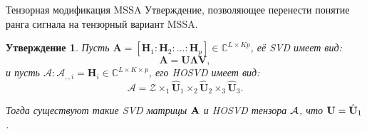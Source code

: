 \documentclass[ucs, notheorems, handout]{beamer}
\newtheorem{statement}{Утверждение}
\begin{document}
    \begin{frame}{Тензорная модификация MSSA}
        Утверждение, позволяющее перенести понятие ранга сигнала на тензорный вариант MSSA.

        \vspace{0.2cm}

        \begin{statement}
            Пусть $\mathbf{A} = [\mathbf{H}_1: \mathbf{H}_2: \ldots: \mathbf{H}_p] \in \mathbb{C}^{L\times Kp}$,
            её SVD имеет вид:
            \[
                \mathbf{A} =\mathbf{U} \mathbf{\Lambda} \mathbf{V},
            \]
            и пусть $\mathcal{A}: \mathcal{A}_{,,i} = \mathbf{H}_i \in \mathbb{C}^{L\times K \times p}$, его HOSVD имеет вид:
            \[
                \mathcal{A}=\mathcal{Z} \times_1 \hat{\mathbf{U}}_1 \times_2 \hat{\mathbf{U}}_2 \times_3 \hat{\mathbf{U}}_3.
            \]

            Тогда существуют такие SVD матрицы $\mathbf{A}$ и HOSVD тензора $\mathcal{A}$,
            что $\mathbf{U} = \hat{\mathbf{U}}_1$.
        \end{statement}
    \end{frame}
\end{document}
